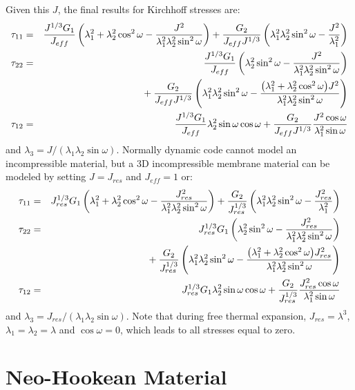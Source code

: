 \documentclass[11pt]{book}
\def\Jeff{J_{eff}}
\def\Jres{J_{res}}
\begin{document}
Given this $J$, the final results for Kirchhoff stresses are:
\begin{eqnarray}
     \tau_{11} & = & {J^{1/3} G_1\over\Jeff}\left(\lambda_1^2 + \lambda_2^2\cos^2\omega - {J^2\over \lambda_1^2\lambda_2^2\sin^2\omega}\right) 
     + 	  {G_2\over \Jeff J^{1/3}}\left(\lambda_1^2\lambda_2^2\sin^2\omega - {J^2\over \lambda_1^2}\right) \\
     \tau_{22} & = & {J^{1/3}G_1\over\Jeff}\left(\lambda_2^2\sin^2\omega - {J^2\over \lambda_1^2\lambda_2^2\sin^2\omega}\right)
\nonumber\\
&&\mbox{}
     + {G_2\over \Jeff J^{1/3}}\left(\lambda_1^2\lambda_2^2\sin^2\omega 
            - {\bigl(\lambda_1^2 + \lambda_2^2\cos^2\omega\bigr)J^2\over \lambda_1^2\lambda_2^2\sin^2\omega}\right) \\
     \tau_{12} & = &  {J^{1/3} G_1\over\Jeff}\lambda_2^2\sin\omega\cos\omega 
               + {G_2\over \Jeff J^{1/3}}{J^2\cos\omega\over \lambda_1^2\sin\omega} 
\end{eqnarray}
and $\lambda_3 = J/(\lambda_1\lambda_2\sin\omega)$.
Normally dynamic code cannot model an incompressible material, but a 3D incompressible membrane material can be modeled by setting $J=\Jres$ and $\Jeff=1$ or:
\begin{eqnarray}
     \tau_{11} & = & \Jres^{1/3} G_1\left(\lambda_1^2 + \lambda_2^2\cos^2\omega - {\Jres^2\over \lambda_1^2\lambda_2^2\sin^2\omega}\right) 
     + { G_2\over \Jres^{1/3}}\left(\lambda_1^2\lambda_2^2\sin^2\omega - {\Jres^2\over \lambda_1^2}\right) \\
     \tau_{22} & = & \Jres^{1/3} G_1\left(\lambda_2^2\sin^2\omega - {\Jres^2\over \lambda_1^2\lambda_2^2\sin^2\omega}\right)
\nonumber\\
&&\mbox{}
     + { G_2\over \Jres^{1/3}}\left(\lambda_1^2\lambda_2^2\sin^2\omega 
            - {\bigl(\lambda_1^2 + \lambda_2^2\cos^2\omega\bigr)\Jres^2\over \lambda_1^2\lambda_2^2\sin^2\omega}\right) \\
     \tau_{12} & = &  \Jres^{1/3}G_1\lambda_2^2\sin\omega\cos\omega 
               + {G_2\over \Jres^{1/3}}{\Jres^2\cos\omega\over \lambda_1^2\sin\omega}
\end{eqnarray}
and $\lambda_3 = \Jres/(\lambda_1\lambda_2\sin\omega)$.
Note that during free thermal expansion, $\Jres=\lambda^3$, $\lambda_1=\lambda_2=\lambda$ and $\cos\omega=0$, which leads to all stresses equal to zero.

\section{Neo-Hookean Material\label{NHM}}
\end{document}
